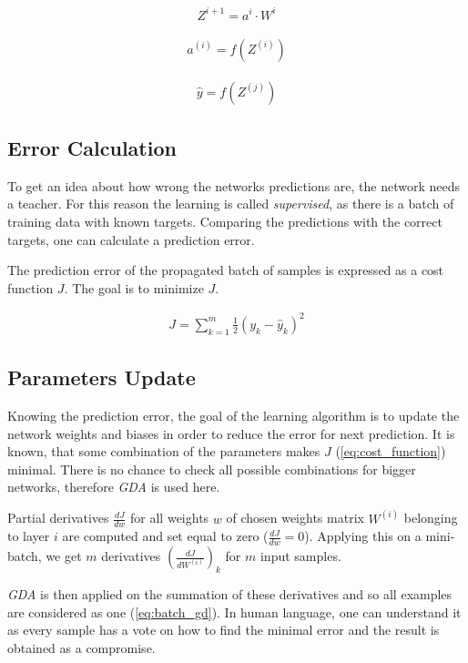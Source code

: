 \begin{align}
Z^{i+1} = a^i \cdot W^i
\end{align}

\begin{align}
a^{(i)} = f(Z^{(i)})
\end{align}

\begin{align}
\hat{y} = f(Z^{(j)})
\end{align}

\subsection{Error Calculation} \label{ssec:error_calculation}
To get an idea about how wrong the networks predictions are, the network needs a teacher. For this reason the learning is called \textit{supervised}, as there is a batch of training data with known targets. Comparing the predictions with the correct targets, one can calculate a prediction error. 

The prediction error of the propagated batch of samples is expressed as a cost function $ J $. The goal is to minimize $ J $.

\begin{align} \label{eq:cost_function}
J = \displaystyle{\sum_{k=1}^m} \frac{1}{2}(y_k - \hat{y}_k)^2
\end{align}

\subsection{Parameters Update} \label{ssec:parameters_update}
Knowing the prediction error, the goal of the learning algorithm is to update the network weights and biases in order to reduce the error for next prediction.  It is known, that some combination of the parameters makes $ J $ (\cref{eq:cost_function}) minimal. There is no chance to check all possible combinations for bigger networks, therefore \textit{GDA} is used here.

Partial derivatives $ \frac{dJ}{dw} $ for all weights $ w $ of chosen weights matrix $ W^{(i)} $ belonging to layer $ i $ are computed and set equal to zero ($ \frac{dJ}{dw} = 0 $). Applying this on a mini-batch, we get $ m $ derivatives $ (\frac{dJ}{dW^{(i)}})_k $ for $ m $ input samples. 

\textit{GDA} is then applied on the summation of these derivatives and so all examples are considered as one (\cref{eq:batch_gd}). In human language, one can understand it as every sample has a vote on how to find the minimal error and the result is obtained as a compromise.

